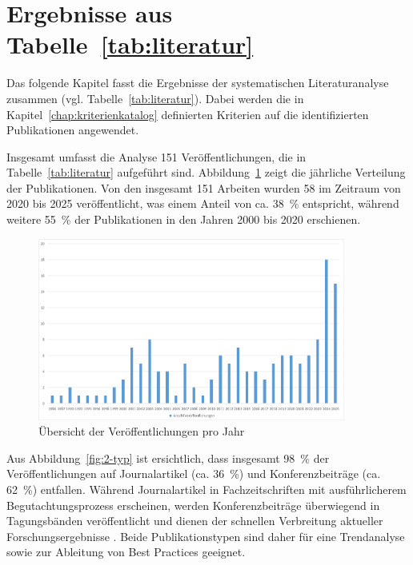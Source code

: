 \section{Ergebnisse aus Tabelle~\ref{tab:literatur}}

Das folgende Kapitel fasst die Ergebnisse der systematischen Literaturanalyse zusammen (vgl. Tabelle~\ref{tab:literatur}). Dabei werden die in Kapitel~\ref{chap:kriterienkatalog} definierten Kriterien auf die identifizierten Publikationen angewendet.

\vspace{1em}

Insgesamt umfasst die Analyse 151 Veröffentlichungen, die in Tabelle~\ref{tab:literatur} aufgeführt sind. Abbildung~\ref{fig:1-veroeffentlichungen-jahr} zeigt die jährliche Verteilung der Publikationen. Von den insgesamt 151 Arbeiten wurden 58 im Zeitraum von 2020 bis 2025 veröffentlicht, was einem Anteil von ca. 38~\% entspricht, während weitere 55~\% der Publikationen in den Jahren 2000 bis 2020 erschienen.

\begin{figure}[!htbp]
    \centering
    \includegraphics[width=0.90\textwidth]{graphics/1-veroeffentlichungen-jahr.png}
    \caption{Übersicht der Veröffentlichungen pro Jahr}
    \label{fig:1-veroeffentlichungen-jahr}
\end{figure}

Aus Abbildung~\ref{fig:2-typ} ist ersichtlich, dass insgesamt 98~\% der Veröffentlichungen auf Journalartikel (ca. 36~\%) und Konferenzbeiträge (ca. 62~\%) entfallen. Während Journalartikel in Fachzeitschriften mit ausführlicherem Begutachtungsprozess erscheinen, werden Konferenzbeiträge überwiegend in Tagungsbänden veröffentlicht und dienen der schnellen Verbreitung aktueller Forschungsergebnisse \cite{abbadia_conference_2022}. Beide Publikationstypen sind daher für eine Trendanalyse sowie zur Ableitung von Best Practices geeignet.

